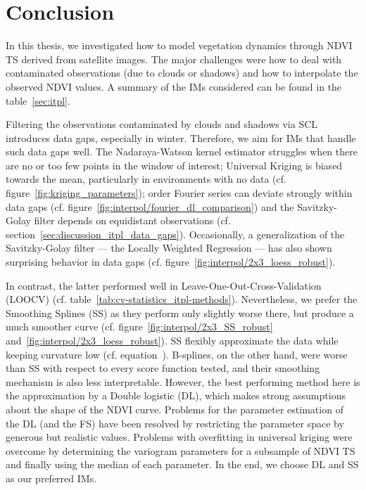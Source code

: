 \chapter{Conclusion}
\label{sec:Conclusion}


    In this thesis, we investigated how to model vegetation dynamics through NDVI {TS} derived from satellite images. The major challenges were how to deal with contaminated observations (due to clouds or shadows) and how to interpolate the observed NDVI values. 
    A summary of the {{IM}}s considered can be found in the table~\ref{sec:itpl}. 
    
    Filtering the observations contaminated by clouds and shadows via SCL introduces data gaps, especially in winter. Therefore, we aim for {{IM}}s that handle such data gaps well. The Nadaraya-Watson kernel estimator struggles when there are no or too few points in the window of interest; Universal Kriging is biased towards the mean, particularly in environments with no data (cf. figure~\ref{fig:kriging_parameters});  order Fourier series can deviate strongly within data gaps (cf. figure~\ref{fig:interpol/fourier_dl_comparison}) and the Savitzky-Golay filter depends on equidistant observations (cf. section~\ref{sec:discussion_itpl_data_gaps}). Occasionally, a generalization of the Savitzky-Golay filter --- the Locally Weighted Regression --- has also shown surprising behavior in data gaps (cf. figure~\ref{fig:interpol/2x3_loess_robust}).
    
    In contrast, the latter performed well in Leave-One-Out-Cross-Validation (LOOCV) (cf. table~\ref{tab:cv-statistics_itpl-methods}). Nevertheless, we prefer the Smoothing Splines (SS) as they perform only slightly worse there, but produce a much smoother curve (cf. figure~\ref{fig:interpol/2x3_SS_robust} and~\ref{fig:interpol/2x3_loess_robust}). SS flexibly approximate the data while keeping curvature low (cf. equation~). B-splines, on the other hand, were worse than SS with respect to every score function tested, and their smoothing mechanism is also less interpretable. However, the best performing method here is the approximation by a Double logistic (DL), which makes strong assumptions about the shape of the NDVI curve. Problems for the parameter estimation of the DL (and the FS) have been resolved by restricting the parameter space by generous but realistic values. Problems with overfitting in universal kriging were overcome by determining the variogram parameters for a subsample of NDVI {TS} and finally using the median of each parameter. 
    In the end, we choose DL and SS as our preferred {{IM}}s.





